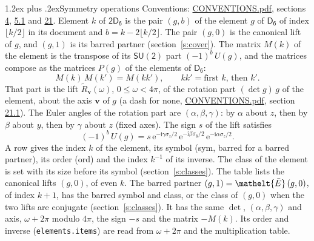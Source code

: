 \documentclass[10pt,a4paper]{article}
\makeatletter
\renewcommand\section{\@startsection{section}{1}{\z@}{-3ex plus -1ex minus -.2ex}%
  {1.2ex plus .2ex}{\normalfont\large\sffamily\bfseries\color{parttitle}}}
\numberwithin{equation}{section}
\newcommand{\eltfont}[1]{{\let\sigma\eltsigma\mathelt{#1}}}
\newcommand{\grp}[1]{\mathsf{#1}}
\newcommand{\elt}[1]{\eltfont{#1}}
\newcommand{\vv}{\mathbf{v}}
\newcommand{\iunit}{\mathrm{i}}
\newcommand{\expe}{\mathrm{e}}
\newcommand{\barred}[1]{\bar{#1}}
\newcommand{\lift}[1]{\tilde{#1}}
\newcommand{\pauli}[1]{\sigma_{#1}}
\makeatother
\begin{document}
\section{Symmetry operations}\label{s:elements}
Conventions: \href{../../CONVENTIONS.pdf}{CONVENTIONS.pdf}, sections \href{../../../rotation/CONVENTIONS.pdf\#conv.4}{4}, \href{../../../rotation/CONVENTIONS.pdf\#conv.5.1}{5.1} and \href{../../CONVENTIONS.pdf\#conv.21}{21}.
\leavevmode\label{n:index.element}\label{n:element.g}Element $k$ of $\grp{2D_{6}}$ is the pair $(g, b)$ of the element $g$ of \href{../../../rotation/data/pdf/D6.pdf}{$\grp{D_{6}}$} of index $\lfloor k/2\rfloor$ in its document and $b = k - 2\lfloor k/2\rfloor$. The pair $(g, 0)$ is the canonical lift of $g$, and $(g, 1)$ is its barred partner (section~\ref{s:cover}). \label{n:matrix.element.pin}\label{n:matrix.element}The matrix $M(k)$ of the element is the transpose of its $\grp{SU(2)}$ part $(-1)^{b}\,U(g)$, and the matrices compose as the matrices $P(g)$ of the elements of $\grp{D_{6}}$:
\begin{equation}\label{e:mprod}M(k)\,M(k') = M(kk'),\qquad kk' = \text{first } k\text{, then } k'.\end{equation}
\leavevmode\label{n:angle.omega}\label{n:vector.axis}\label{n:vector.pole}That part is the lift $\lift{R}_{\vv}(\omega)$, $0 \le \omega < 4\pi$, of the rotation part $(\det g)\,g$ of the element, about the axis $\vv$ of $g$ (a dash for none, \href{../../CONVENTIONS.pdf}{CONVENTIONS.pdf}, section \href{../../CONVENTIONS.pdf\#conv.21.1}{21.1}). \label{n:angle.euler.alpha}\label{n:angle.euler.beta}\label{n:angle.euler.gamma}\label{n:vector.coordinates}The Euler angles of the rotation part are $(\alpha,\beta,\gamma)$: by $\alpha$ about $z$, then by $\beta$ about $y$, then by $\gamma$ about $z$ (fixed axes). \label{n:local.euler.sign}The sign $s$ of the lift satisfies
\begin{equation}\label{e:euler}(-1)^{b}\,U(g) = s\,\expe^{-\iunit\gamma\pauli{z}/2}\,\expe^{-\iunit\beta\pauli{y}/2}\,\expe^{-\iunit\alpha\pauli{z}/2}.\end{equation}
\leavevmode\label{n:index.element.inverse}\label{n:head.sym}\label{n:head.ord}A row gives the index $k$ of the element, its symbol (sym, barred for a barred partner), its order (ord) and the index $k^{-1}$ of its inverse. \label{n:head.class}The class of the element is set with its size before its symbol (section~\ref{s:classes}).
The table lists the canonical lifts $(g, 0)$, of even $k$. The barred partner $(g, 1) = \elt{\barred{E}}\,(g, 0)$, of index $k + 1$, has the barred symbol and class, or the class of $(g, 0)$ when the two lifts are conjugate (section~\ref{s:classes}). It has the same $\det$, $(\alpha,\beta,\gamma)$ and axis, $\omega + 2\pi$ modulo $4\pi$, the sign $-s$ and the matrix $-M(k)$. Its order and inverse (\texttt{elements.items}) are read from $\omega + 2\pi$ and the multiplication table.
\end{document}
